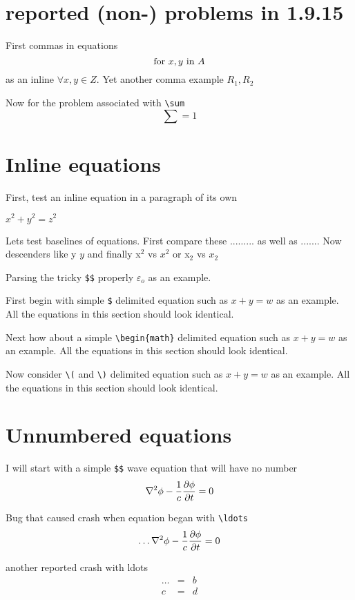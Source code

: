 \documentclass{article}
\begin{document}
\section{reported (non-) problems in 1.9.15}
First commas in equations
$$
\hbox{for } x,y \hbox{ in } A
$$
as an inline $\forall x, y \in Z$.  Yet another comma example
$R_1, R_2$ 

Now for the problem associated with \verb#\sum#
$$
\sum = 1
$$

\section{Inline equations}
First, test an inline equation in a paragraph of its own

$x^2+y^2=z^2$

Lets test baselines of equations.  First compare these ...$\ldots$... as
well as ...$.$...  Now descenders like y $y$ and finally x$^2$ vs $x^2$ or
x$_2$ vs $x_2$

Parsing the tricky \verb#$$# properly $\varepsilon $$_o$ as an example.

First begin with simple \verb#$# delimited equation such as
$x+y=w$ as an example.  All the equations in this section should
look identical.

Next how about a simple \verb#\begin{math}# delimited equation such as
\begin{math}x+y=w\end{math} as an example.  All the equations in this section should
look identical.

Now consider \verb#\(# and \verb#\)# delimited equation such as
\(x+y=w\) as an example.  All the equations in this section should
look identical.

\section{Unnumbered equations}

I will start with a simple \verb#$$# wave equation
that will have no number
$$
\nabla^2 \phi -{1\over c} {\partial \phi\over \partial t}  = 0
$$

Bug that caused crash when equation began with \verb#\ldots#
$$
\ldots\nabla^2 \phi -{1\over c} {\partial \phi\over \partial t}  = 0
$$

another reported crash with ldots
\begin{eqnarray*} 
\ldots & = & b \\
c      & = & d
\end{eqnarray*} 
\end{document}
